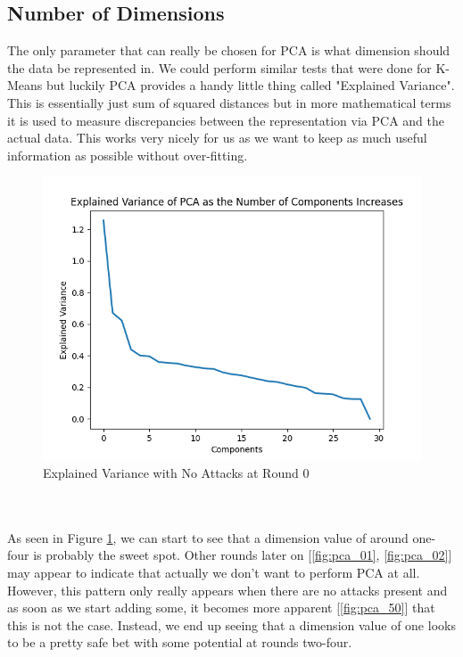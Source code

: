 \subsection{Number of Dimensions}
The only parameter that can really be chosen for PCA is what dimension should the data be represented in.
We could perform similar tests that were done for K-Means but luckily PCA provides a handy little thing called "Explained Variance".
This is essentially just sum of squared distances but in more mathematical terms it is used to measure discrepancies between the representation via PCA and the actual data.
This works very nicely for us as we want to keep as much useful information as possible without over-fitting.
\begin{figure}[htbp]
	\centering
    \includegraphics[scale=0.5]{my_agg/graphs/0_r0.png}
	\caption{Explained Variance with No Attacks at Round 0}
	\label{fig:pca_00}
\end{figure}
\\ \\
As seen in Figure \ref{fig:pca_00}, we can start to see that a dimension value of around one-four is probably the sweet spot.
Other rounds later on [\ref{fig:pca_01}, \ref{fig:pca_02}] may appear to indicate that actually we don't want to perform PCA at all.
However, this pattern only really appears when there are no attacks present and as soon as we start adding some, it becomes more apparent [\ref{fig:pca_50}] that this is not the case.
Instead, we end up seeing that a dimension value of one looks to be a pretty safe bet with some potential at rounds two-four.



